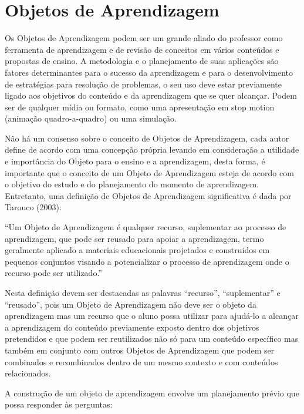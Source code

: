 \documentclass[12pt, openright, a4paper, brazil, english, french, spanish, bibjustif, openany, oneside]{abntex2}
\begin{document}
\section{Objetos de Aprendizagem}

Os Objetos de Aprendizagem podem ser um grande aliado do professor como ferramenta de aprendizagem e de revisão de conceitos em vários conteúdos e propostas de ensino. A metodologia e o planejamento de suas aplicações são fatores determinantes para o sucesso da aprendizagem e para o desenvolvimento de estratégias para resolução de problemas, o seu uso deve estar previamente ligado aos objetivos do conteúdo e da aprendizagem que se quer alcançar. Podem ser de qualquer mídia ou formato, como uma apresentação em stop motion (animação quadro-a-quadro) ou uma simulação.

Não há um consenso sobre o conceito de Objetos de Aprendizagem, cada autor define de acordo com uma concepção própria levando em consideração a utilidade e importância do Objeto para o ensino e a aprendizagem, desta forma, é importante que o conceito de um Objeto de Aprendizagem esteja de acordo com o objetivo do estudo e do planejamento do momento de aprendizagem. Entretanto, uma definição de Objetos de Aprendizagem significativa é dada por Tarouco (2003):


\begin{citacao}

``Um Objeto de Aprendizagem é qualquer recurso, suplementar ao processo de aprendizagem, que pode ser reusado para apoiar a aprendizagem, termo geralmente aplicado a materiais educacionais projetados e construidos em pequenos conjuntos visando a potencializar o processo de aprendizagem onde o recurso pode ser utilizado.''\cite{tarouco}

\end{citacao}

Nesta definição devem ser destacadas as palavras ``recurso'', ``suplementar'' e ``reusado'', pois um Objeto de Aprendizagem não deve ser o objeto da aprendizagem mas um recurso que o aluno possa utilizar para ajudá-lo a alcançar a aprendizagem do conteúdo previamente exposto dentro dos objetivos pretendidos e que podem ser reutilizados não só para um conteúdo específico mas também em conjunto com outros Objetos de Aprendizagem que podem ser combinados e recombinados dentro de um mesmo contexto e com conteúdos relacionados.

A construção de um objeto de aprendizagem envolve um planejamento prévio que possa responder às perguntas:
\end{document}
